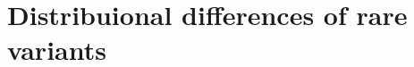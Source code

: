 \documentclass[../header.tex]{subfiles}
\begin{document}
\chapter{Distribuional differences of rare variants}
\label{cha:distribuional_differences_of_rare_variants}



\end{document}
